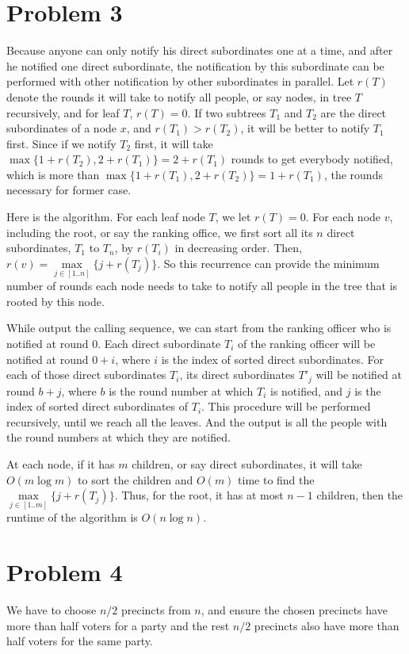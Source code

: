 \documentclass[letter,12pt]{article}
\begin{document}
\section*{Problem 3}
Because anyone can only notify his direct subordinates one at a time, and
after he notified one direct subordinate, the notification by this subordinate
can be performed with other notification by other subordinates in parallel.
Let $r(T)$ denote the rounds it will take to notify all people, or say nodes,
in tree $T$ recursively, and for leaf $T$, $r(T)=0$. If two subtrees $T_1$ and 
$T_2$ are the direct subordinates of a node $x$, and $r(T_1) > r(T_2)$, it 
will be better to notify $T_1$ first. Since if we notify $T_2$ first, it will take 
$\max\{1+r(T_2), 2+r(T_1)\}=2+r(T_1)$ rounds to get everybody notified, 
which is more than $\max\{1+r(T_1), 2+r(T_2)\}=1+r(T_1)$, the rounds
necessary for former case.

Here is the algorithm. For each leaf node $T$, we let $r(T) = 0$. For each
node $v$, including the root, or say the ranking office, we first sort all its  
$n$ direct subordinates, $T_1$ to $T_n$, by $r(T_i)$ in decreasing order. 
Then, $r(v) = \max\limits_{j \in [1..n]}\{j+r(T_j)\}$. So this recurrence can 
provide the minimum number of rounds each node needs to take to notify
all people in the tree that is rooted by this node.

While output the calling sequence, we can start from the ranking officer who
is notified at round 0. Each direct subordinate $T_i$ of the ranking officer 
will be notified at round $0+i$, where $i$ is the index of sorted direct 
subordinates. For each of those direct subordinates $T_i$, its direct 
subordinates $T'_j$ will be notified at round $b+j$, where $b$ is the round 
number at which $T_i$ is notified, and $j$ is the index of sorted direct 
subordinates of $T_i$. This procedure will be performed recursively, until
we reach all the leaves. And the output is all the people with the round
numbers at which they are notified.

At each node, if it has $m$ children, or say direct subordinates, it will take
$O(m\log m)$ to sort the children and $O(m)$ time to find the 
$\max\limits_{j \in [1..m]}\{j+r(T_j)\}$. Thus, for the root, it has at most
$n-1$ children, then the runtime of the algorithm is $O(n\log n)$.

\section*{Problem 4}
We have to choose $n/2$ precincts
from $n$, and ensure the chosen precincts have more than half voters for
a party and the rest $n/2$ precincts also have more than half voters for
the same party. 
\end{document}

